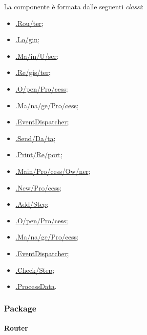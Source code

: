 La componente è formata dalle seguenti \textit{classi}:
\begin{itemize}
	\item \hyperref[router]{\logic{}.Rou\fshyp{}ter};
	\item \hyperref[login]{\logic{}.Lo\fshyp{}gin};
	\item \hyperref[mainUser]{\logicUser{}.Ma\fshyp{}in\fshyp{}U\fshyp{}ser};
	\item \hyperref[register]{\logicUser{}.Re\fshyp{}gis\fshyp{}ter};
	\item \hyperref[openProcessU]{\logicUser{}.O\fshyp{}pen\fshyp{}Pro\fshyp{}cess};
	\item \hyperref[managementProcessU]{\logicUser{}.Ma\fshyp{}na\fshyp{}ge\fshyp{}Pro\fshyp{}cess};
	\item \hyperref[ev1]{\logicUser{}.EventDispatcher};
	\item \hyperref[sendData]{\logicUser{}.Send\fshyp{}Da\fshyp{}ta};
	\item \hyperref[printReport]{\logicUser{}.Print\fshyp{}Re\fshyp{}port};
	\item \hyperref[mainProcessOwner]{\logicAdmin{}.Main\fshyp{}Pro\fshyp{}cess\fshyp{}Ow\fshyp{}ner};
	\item \hyperref[newProcess]{\logicAdmin{}.New\fshyp{}Pro\fshyp{}cess};
	\item \hyperref[addStep]{\logicAdmin{}.Add\fshyp{}Step};
	\item \hyperref[openProcess]{\logicAdmin{}.O\fshyp{}pen\fshyp{}Pro\fshyp{}cess};
	\item \hyperref[manageProcess]{\logicAdmin{}.Ma\fshyp{}na\fshyp{}ge\fshyp{}Pro\fshyp{}cess};
	\item \hyperref[ev2]{\logicAdmin{}.EventDispatcher};
	\item \hyperref[checkStep]{\logicAdmin{}.Check\fshyp{}Step};
	\item \hyperref[pd]{\logicAdmin{}.ProcessData}.
	
\end{itemize}


\subsubsection{Package \logic{}}

\paragraph{Router}
\label{router}

